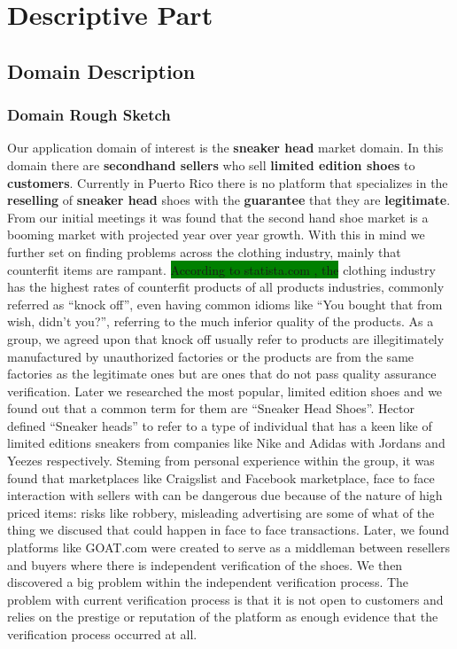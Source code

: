 \chapter{Descriptive Part}
\newpage
\section{Domain Description}
\subsection{Domain Rough Sketch}
Our application domain of interest is the \textbf{sneaker head} market domain. In this domain there are \textbf{secondhand sellers} who sell \textbf{limited edition shoes} to \textbf{customers}. Currently in Puerto Rico there is no platform that specializes in the \textbf{reselling} of \textbf{sneaker head} shoes with the \textbf{guarantee} that they are \textbf{legitimate}. From our initial meetings it was found that the second hand shoe market is a booming market with projected year over year growth. With this in mind we further set on finding problems across the clothing industry, mainly that counterfit items are rampant. \colorbox{green}{According to statista.com \cite{InfographicIndustriesMost2019}, the} clothing industry has the highest rates of counterfit products of all products industries, commonly referred as ``knock off'', even having common idioms like ``You bought that from wish, didn't you?'', referring to the much inferior quality of the products. As a group, we agreed upon that knock off usually refer to products are illegitimately manufactured by unauthorized factories or the products are from the same factories as the legitimate ones but are ones that do not pass quality assurance verification. Later we researched the most popular, limited edition shoes and we found out that a common term for them are ``Sneaker Head Shoes''. Hector defined ``Sneaker heads'' to refer to a type of individual that has a keen like of limited editions sneakers from companies like Nike and Adidas with Jordans and Yeezes respectively. Steming from personal experience within the group, it was found that marketplaces like Craigslist and Facebook marketplace, face to face interaction with sellers with can be dangerous due because of the nature of high priced items: risks like robbery, misleading advertising are some of what of the thing we discused that could happen in face to face transactions. Later, we found platforms like GOAT.com were created to serve as a middleman between resellers and buyers where there is independent verification of the shoes. We then discovered a big problem within the independent verification process. The problem with current verification process is that it is not open to customers and relies on the prestige or reputation of the platform as enough evidence that the verification process occurred at all.
